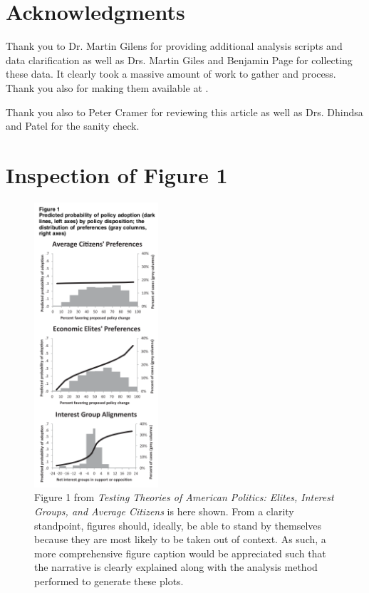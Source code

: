 \documentclass[]{article}
\begin{document}
\section{Acknowledgments}
Thank you to Dr. Martin Gilens for providing additional analysis scripts and data clarification as well as Drs. Martin Giles and Benjamin Page for collecting these data. 
It clearly took a massive amount of work to gather and process.
Thank you also for making them available at \cite{gilens}.

Thank you also to Peter Cramer for reviewing this article as well as Drs. Dhindsa and Patel for the sanity check.

\section{Inspection of Figure 1}

\begin{figure}[H]
	\begin{center}
		\includegraphics[height=400px]{./figures/figure1.png}
	\end{center}	
	\caption{Figure 1 from \textit{Testing Theories of American Politics: Elites, Interest Groups, and Average Citizens} is here shown. From a clarity standpoint, figures should, ideally, be able to stand by themselves because they are most likely to be taken out of context. As such, a more comprehensive figure caption would be appreciated such that the narrative is clearly explained along with the analysis method performed to generate these plots.}
	\label{paper_figure1}
\end{figure}
\end{document}
